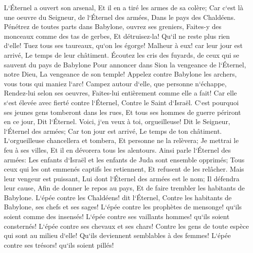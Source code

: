 \verse L`Éternel a ouvert son arsenal, Et il en a tiré les armes de sa colère; Car c`est là une oeuvre du Seigneur, de l`Éternel des armées, Dans le pays des Chaldéens. 
\verse Pénétrez de toutes parts dans Babylone, ouvrez ses greniers, Faites-y des monceaux comme des tas de gerbes, Et détruisez-la! Qu`il ne reste plus rien d`elle! 
\verse Tuez tous ses taureaux, qu`on les égorge! Malheur à eux! car leur jour est arrivé, Le temps de leur châtiment. 
\verse Écoutez les cris des fuyards, de ceux qui se sauvent du pays de Babylone Pour annoncer dans Sion la vengeance de l`Éternel, notre Dieu, La vengeance de son temple! 
\verse Appelez contre Babylone les archers, vous tous qui maniez l`arc! Campez autour d`elle, que personne n`échappe, Rendez-lui selon ses oeuvres, Faites-lui entièrement comme elle a fait! Car elle s`est élevée avec fierté contre l`Éternel, Contre le Saint d`Israël. 
\verse C`est pourquoi ses jeunes gens tomberont dans les rues, Et tous ses hommes de guerre périront en ce jour, Dit l`Éternel. 
\verse Voici, j`en veux à toi, orgueilleuse! Dit le Seigneur, l`Éternel des armées; Car ton jour est arrivé, Le temps de ton châtiment. 
\verse L`orgueilleuse chancellera et tombera, Et personne ne la relèvera; Je mettrai le feu à ses villes, Et il en dévorera tous les alentours. 
\verse Ainsi parle l`Éternel des armées: Les enfants d`Israël et les enfants de Juda sont ensemble opprimés; Tous ceux qui les ont emmenés captifs les retiennent, Et refusent de les relâcher. 
\verse Mais leur vengeur est puissant, Lui dont l`Éternel des armées est le nom; Il défendra leur cause, Afin de donner le repos au pays, Et de faire trembler les habitants de Babylone. 
\verse L`épée contre les Chaldéens! dit l`Éternel, Contre les habitants de Babylone, ses chefs et ses sages! 
\verse L`épée contre les prophètes de mensonge! qu`ils soient comme des insensés! L`épée contre ses vaillants hommes! qu`ils soient consternés! 
\verse L`épée contre ses chevaux et ses chars! Contre les gens de toute espèce qui sont au milieu d`elle! Qu`ils deviennent semblables à des femmes! L`épée contre ses trésors! qu`ils soient pillés! 
